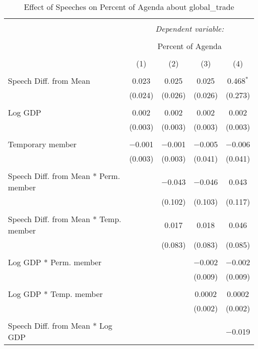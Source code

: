 
\begin{table}[!htbp] \centering 
  \caption{Effect of Speeches on Percent of Agenda about global_trade} 
  \label{} 
\begin{tabular}{@{\extracolsep{5pt}}lcccc} 
\\[-1.8ex]\hline 
\hline \\[-1.8ex] 
 & \multicolumn{4}{c}{\textit{Dependent variable:}} \\ 
\cline{2-5} 
\\[-1.8ex] & \multicolumn{4}{c}{Percent of Agenda} \\ 
\\[-1.8ex] & (1) & (2) & (3) & (4)\\ 
\hline \\[-1.8ex] 
 Speech Diff. from Mean & 0.023 & 0.025 & 0.025 & 0.468$^{*}$ \\ 
  & (0.024) & (0.026) & (0.026) & (0.273) \\ 
  & & & & \\ 
 Log GDP & 0.002 & 0.002 & 0.002 & 0.002 \\ 
  & (0.003) & (0.003) & (0.003) & (0.003) \\ 
  & & & & \\ 
 Temporary member & $-$0.001 & $-$0.001 & $-$0.005 & $-$0.006 \\ 
  & (0.003) & (0.003) & (0.041) & (0.041) \\ 
  & & & & \\ 
 Speech Diff. from Mean * Perm. member &  & $-$0.043 & $-$0.046 & 0.043 \\ 
  &  & (0.102) & (0.103) & (0.117) \\ 
  & & & & \\ 
 Speech Diff. from Mean * Temp. member &  & 0.017 & 0.018 & 0.046 \\ 
  &  & (0.083) & (0.083) & (0.085) \\ 
  & & & & \\ 
 Log GDP * Perm. member &  &  & $-$0.002 & $-$0.002 \\ 
  &  &  & (0.009) & (0.009) \\ 
  & & & & \\ 
 Log GDP * Temp. member &  &  & 0.0002 & 0.0002 \\ 
  &  &  & (0.002) & (0.002) \\ 
  & & & & \\ 
 Speech Diff. from Mean * Log GDP &  &  &  & $-$0.019 \\ 

\end{tabular}
\end{table}
